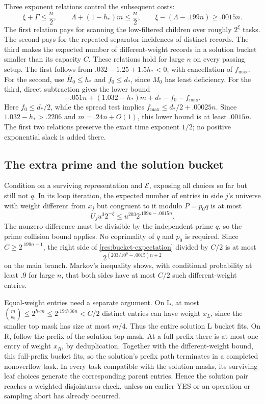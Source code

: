 Three exponent relations control the subsequent costs:
\begin{equation}\label{res:exponent-relations}
 \xi+\Gamma\le\frac n2,\qquad
 \Lambda+(1-h_*)m\le\frac n2,\qquad
 \xi-(\Lambda-.199n)\ge .0015n.
\end{equation}
The first relation pays for scanning the low-filtered children over
roughly \(2^\xi\) tasks. The second pays for the repeated separator
incidences of distinct records. The third makes the expected number
of different-weight records in a solution bucket smaller than its
capacity \(C\). These relations hold for large \(n\) on every passing
setup. The first follows
from \(.032-1.25+1.5h_*<0\), with cancellation of \(f_{\max}\).
For the second, use \(\overline H_0\le h_*\) and
\(f_0\le d_*\), since \(M_0\) has least deficiency. For the
third, direct subtraction gives the lower bound
\[
 -.051n+(1.032-h_*)m+d_*-f_0-f_{\max}.
\]
Here \(f_0\le d_*/2\), while the spread test implies
\(f_{\max}\le d_*/2+.00025n\). Since
\(1.032-h_*>.2206\) and \(m=.24n+O(1)\), this lower bound is
at least \(.0015n\). The first two relations preserve the exact
time exponent \(1/2\); no positive exponential slack is added there.

\subsection{The extra prime and the solution bucket}

Condition on a surviving representation and \(\mathcal E\), exposing
all choices so far but still not \(q\). In its loop iteration, the
expected number of entries in side \(j\)'s universe with weight
different from \(x_j\) but congruent to it modulo \(P=p_0q\) is
at most
\begin{equation}\label{res:bucket-expectation}
 U_j u^3 2^{-\xi}
 \le u^{203}2^{.199n-.0015n}.
\end{equation}
The nonzero difference must be divisible by the independent prime
\(q\), so the prime collision bound applies. No coprimality of
\(q\) and \(p_0\) is required. Since
\(C\ge 2^{.199n-1}\), the right side of
\eqref{res:bucket-expectation} divided by \(C/2\) is at most
\[
 2^{(203/10^9-.0015)n+2}
\]
on the main branch. Markov's inequality shows, with conditional
probability at least \(.9\) for large \(n\), that both sides have
at most \(C/2\) such different-weight entries.

Equal-weight entries need a separate argument. On L, at most
\(\binom m{k_0}\le 2^{h_*m}\le 2^{.194736n}<C/2\) distinct
entries can have weight \(x_L\), since the smaller top mask has
size at most \(m/4\). Thus the entire solution L bucket fits. On R,
follow the prefix of the solution top mask. At a full prefix there is
at most one entry of weight \(x_R\), by deduplication. Together
with the different-weight bound, this full-prefix bucket fits, so the
solution's prefix path terminates in a completed nonoverflow task.
In every task compatible with the solution masks, its surviving leaf
choices generate the corresponding parent entries. Hence the solution
pair reaches a weighted disjointness check, unless an earlier YES or
an operation or sampling abort has already occurred.

